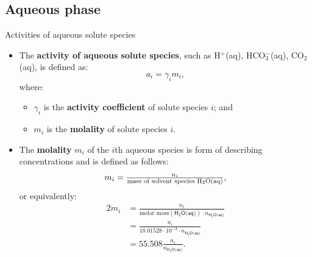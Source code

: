 \subsection{Aqueous phase}
%
%
%
\begin{frame}{Activities of aqueous solute species}
%
\lcol
\begin{itemize}
\item The \alert{\textbf{activity of aqueous solute species}}, such as H$^{+}$(aq), HCO$_{3}^{-}$(aq),
CO$_{2}$(aq), is defined as:
\[
a_{i}=\gamma_{i}m_{i},
\]
where:
\begin{itemize}
\item $\gamma_{i}$ is the \textbf{activity coefficient} of solute species
$i$; and
\item $m_{i}$ is the \textbf{molality} of solute species $i$.	
\end{itemize}
\end{itemize}
\rcol
\pause
\begin{itemize}
\item The  \alert{\textbf{molality}} $m_{i}$ of the $i$th aqueous species is form of describing concentrations and is defined as follows:
\[
m_{i}=\tfrac{n_{i}}{\text{mass of solvent species H\ensuremath{_{2}}O(aq)}},
\]
or equivalently:
\begin{alignat*}{2}
m_{i} & =  \tfrac{n_{i}}{\mbox{molar mass}(\mathsf{H_{2}O\text{(aq)}}) \cdot n_{\mathsf{H_{2}O\text{(aq)}}}} \\
         & =  \tfrac{n_{i}}{18.01528 \cdot 10^{-3} \cdot  n_{\mathsf{H_{2}O\text{(aq)}}}} \\
         & = 55.508\tfrac{n_{i}}{n_{\mathsf{H_{2}O\text{(aq)}}}}.
\end{alignat*}
\end{itemize}
\ecol
\end{frame}
%
%
